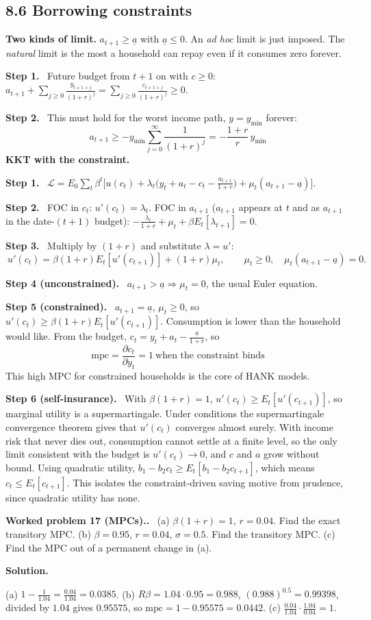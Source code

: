 \documentclass[12pt]{article}
\newcommand{\st}[1]{\par\smallskip\textbf{Step #1.}\ }
\newcommand{\ans}[1]{\[\boxed{\ #1\ }\]}
\newcommand{\prob}[1]{\par\bigskip\textbf{Worked problem #1.}\ }
\newcommand{\sol}{\par\smallskip\textbf{Solution.}\par}
\begin{document}
\subsection*{8.6 Borrowing constraints}
\textbf{Two kinds of limit.} $a_{t+1}\ge\underline a$ with $\underline a\le0$.
An \emph{ad hoc} limit is just imposed. The \emph{natural} limit is the most a
household can repay even if it consumes zero forever.
\st{1} Future budget from $t+1$ on with $c\ge0$:
$a_{t+1}+\sum_{j\ge0}\frac{y_{t+1+j}}{(1+r)^j}=\sum_{j\ge0}\frac{c_{t+1+j}}{(1+r)^j}\ge0$.
\st{2} This must hold for the worst income path, $y=y_{\min}$ forever:
\ans{a_{t+1}\ge-y_{\min}\sum_{j=0}^\infty\frac{1}{(1+r)^j}=-\frac{1+r}{r}\,y_{\min}}
\textbf{KKT with the constraint.}
\st{1} $\mathcal L=E_0\sum_t\beta^t\big[u(c_t)+\lambda_t\big(y_t+a_t-c_t-\frac{a_{t+1}}{1+r}\big)+\mu_t(a_{t+1}-\underline a)\big]$.
\st{2} FOC in $c_t$: $u'(c_t)=\lambda_t$. FOC in $a_{t+1}$ ($a_{t+1}$ appears at $t$ and as $a_{t+1}$ in the date-$(t+1)$ budget):
$-\frac{\lambda_t}{1+r}+\mu_t+\beta E_t[\lambda_{t+1}]=0$.
\st{3} Multiply by $(1+r)$ and substitute $\lambda=u'$:
\ans{u'(c_t)=\beta(1+r)E_t[u'(c_{t+1})]+(1+r)\mu_t,\qquad\mu_t\ge0,\quad\mu_t(a_{t+1}-\underline a)=0 .}
\st{4 (unconstrained)} $a_{t+1}>\underline a\Rightarrow\mu_t=0$, the usual Euler equation.
\st{5 (constrained)} $a_{t+1}=\underline a$, $\mu_t\ge0$, so $u'(c_t)\ge\beta(1+r)E_t[u'(c_{t+1})]$. Consumption is lower than the household would like. From the budget, $c_t=y_t+a_t-\frac{\underline a}{1+r}$, so
\ans{\text{mpc}=\frac{\partial c_t}{\partial y_t}=1\ \text{when the constraint binds}}
This high MPC for constrained households is the core of HANK models.
\st{6 (self-insurance)} With $\beta(1+r)=1$, $u'(c_t)\ge E_t[u'(c_{t+1})]$, so marginal utility is a supermartingale. Under conditions the supermartingale convergence theorem gives that $u'(c_t)$ converges almost surely. With income risk that never dies out, consumption cannot settle at a finite level, so the only limit consistent with the budget is $u'(c_t)\to0$, and $c$ and $a$ grow without bound. Using quadratic utility, $b_1-b_2c_t\ge E_t[b_1-b_2c_{t+1}]$, which means $c_t\le E_t[c_{t+1}]$. This isolates the constraint-driven saving motive from prudence, since quadratic utility has none.

\prob{17 (MPCs).} (a) $\beta(1+r)=1$, $r=0.04$. Find the exact transitory MPC.
(b) $\beta=0.95$, $r=0.04$, $\sigma=0.5$. Find the transitory MPC. (c) Find the MPC out of a permanent change in (a).
\sol
(a) $1-\frac{1}{1.04}=\frac{0.04}{1.04}=0.0385$.
(b) $R\beta=1.04\cdot0.95=0.988$, $(0.988)^{0.5}=0.99398$, divided by $1.04$ gives $0.95575$, so $\text{mpc}=1-0.95575=0.0442$.
(c) $\frac{0.04}{1.04}\cdot\frac{1.04}{0.04}=1$.
\end{document}

